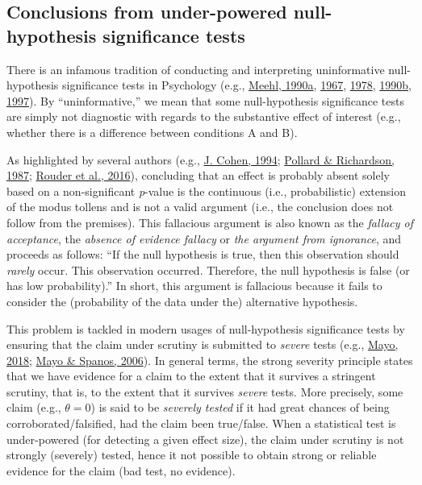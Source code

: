 \documentclass[
  english,
  man, donotrepeattitle,floatsintext]{apa6}
\begin{document}
\hypertarget{conclusions-from-under-powered-null-hypothesis-significance-tests}{%
\subsection{Conclusions from under-powered null-hypothesis significance tests}\label{conclusions-from-under-powered-null-hypothesis-significance-tests}}

There is an infamous tradition of conducting and interpreting uninformative null-hypothesis significance tests in Psychology (e.g., \protect\hyperlink{ref-meehl_appraising_1990-1}{Meehl, 1990a}, \protect\hyperlink{ref-meehl_theory-testing_1967}{1967}, \protect\hyperlink{ref-meehl_theoretical_1978}{1978}, \protect\hyperlink{ref-meehl_why_1990}{1990b}, \protect\hyperlink{ref-harlow_problem_1997}{1997}). By ``uninformative,'' we mean that some null-hypothesis significance tests are simply not diagnostic with regards to the substantive effect of interest (e.g., whether there is a difference between conditions A and B).

As highlighted by several authors (e.g., \protect\hyperlink{ref-cohen_earth_1994}{J. Cohen, 1994}; \protect\hyperlink{ref-pollard_probability_1987}{Pollard \& Richardson, 1987}; \protect\hyperlink{ref-rouder_is_2016}{Rouder et al., 2016}), concluding that an effect is probably absent solely based on a non-significant \emph{p}-value is the continuous (i.e., probabilistic) extension of the modus tollens and is not a valid argument (i.e., the conclusion does not follow from the premises). This fallacious argument is also known as the \emph{fallacy of acceptance}, the \emph{absence of evidence fallacy} or \emph{the argument from ignorance}, and proceeds as follows: ``If the null hypothesis is true, then this observation should \emph{rarely} occur. This observation occurred. Therefore, the null hypothesis is false (or has low probability).'' In short, this argument is fallacious because it fails to consider the (probability of the data under the) alternative hypothesis.

This problem is tackled in modern usages of null-hypothesis significance tests by ensuring that the claim under scrutiny is submitted to \emph{severe} tests (e.g., \protect\hyperlink{ref-mayo_statistical_2018}{Mayo, 2018}; \protect\hyperlink{ref-mayo_severe_2006}{Mayo \& Spanos, 2006}). In general terms, the strong severity principle states that we have evidence for a claim to the extent that it survives a stringent scrutiny, that is, to the extent that it survives \emph{severe} tests. More precisely, some claim (e.g., \(\theta = 0\)) is said to be \emph{severely tested} if it had great chances of being corroborated/falsified, had the claim been true/false. When a statistical test is under-powered (for detecting a given effect size), the claim under scrutiny is not strongly (severely) tested, hence it not possible to obtain strong or reliable evidence for the claim (bad test, no evidence).
\end{document}
